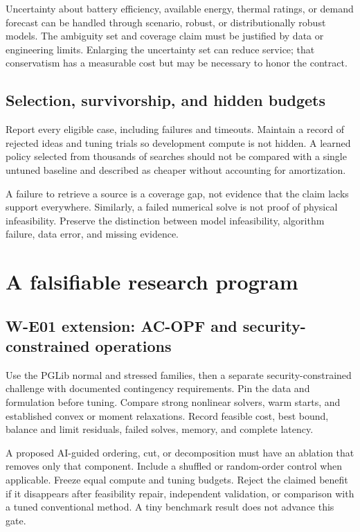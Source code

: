 \documentclass[11pt,letterpaper]{article}
\begin{document}
Uncertainty about battery efficiency, available energy, thermal ratings, or demand forecast can be handled through scenario, robust, or distributionally robust models. The ambiguity set and coverage claim must be justified by data or engineering limits. Enlarging the uncertainty set can reduce service; that conservatism has a measurable cost but may be necessary to honor the contract.

\subsection{Selection, survivorship, and hidden budgets}
Report every eligible case, including failures and timeouts. Maintain a record of rejected ideas and tuning trials so development compute is not hidden. A learned policy selected from thousands of searches should not be compared with a single untuned baseline and described as cheaper without accounting for amortization.

A failure to retrieve a source is a coverage gap, not evidence that the claim lacks support everywhere. Similarly, a failed numerical solve is not proof of physical infeasibility. Preserve the distinction between model infeasibility, algorithm failure, data error, and missing evidence.

\section{A falsifiable research program}
\label{sec:program}
\subsection{W-E01 extension: AC-OPF and security-constrained operations}
Use the PGLib normal and stressed families, then a separate security-constrained challenge with documented contingency requirements. Pin the data and formulation before tuning. Compare strong nonlinear solvers, warm starts, and established convex or moment relaxations. Record feasible cost, best bound, balance and limit residuals, failed solves, memory, and complete latency.

A proposed AI-guided ordering, cut, or decomposition must have an ablation that removes only that component. Include a shuffled or random-order control when applicable. Freeze equal compute and tuning budgets. Reject the claimed benefit if it disappears after feasibility repair, independent validation, or comparison with a tuned conventional method. A tiny benchmark result does not advance this gate.
\end{document}
